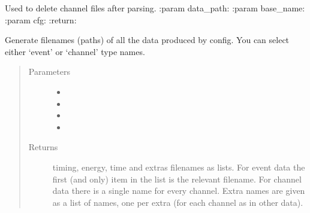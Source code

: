 \documentclass[letterpaper,10pt,english]{sphinxmanual}
\begin{document}
\begin{fulllineitems}
\label{\detokenize{autodocs/utils:listmode.utils.delete_channel_data}}
\sphinxAtStartPar
Used to delete channel files after parsing.
:param data\_path:
:param base\_name:
:param cfg:
:return:

\end{fulllineitems}


\begin{fulllineitems}
\label{\detokenize{autodocs/utils:listmode.utils.find_data_files}}
\sphinxAtStartPar
Generate filenames (paths) of all the data produced by config. You can select either ‘event’ or ‘channel’
type names.
\begin{quote}\begin{description}
\item[{Parameters}] \leavevmode\begin{itemize}
\item {} 
\sphinxAtStartPar
{} \textendash{} 

\item {} 
\sphinxAtStartPar
{} \textendash{} 

\item {} 
\sphinxAtStartPar
{} \textendash{} 

\item {} 
\sphinxAtStartPar
{} \textendash{} 

\end{itemize}

\item[{Returns}] \leavevmode
\sphinxAtStartPar
timing, energy, time and extras filenames as lists. For event data the first (and only) item in the list
is the relevant filename. For channel data there is a single name for every channel. Extra names are given
as a list of names, one per extra (for each channel as in other data).

\end{description}\end{quote}

\end{fulllineitems}
\end{document}
